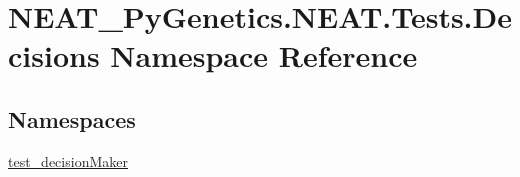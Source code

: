 \hypertarget{namespaceNEAT__PyGenetics_1_1NEAT_1_1Tests_1_1Decisions}{}\section{N\+E\+A\+T\+\_\+\+Py\+Genetics.\+N\+E\+A\+T.\+Tests.\+Decisions Namespace Reference}
\label{namespaceNEAT__PyGenetics_1_1NEAT_1_1Tests_1_1Decisions}
\subsection*{Namespaces}
\begin{DoxyCompactItemize}
\item 
 \hyperlink{namespaceNEAT__PyGenetics_1_1NEAT_1_1Tests_1_1Decisions_1_1test__decisionMaker}{test\+\_\+decision\+Maker}
\end{DoxyCompactItemize}
